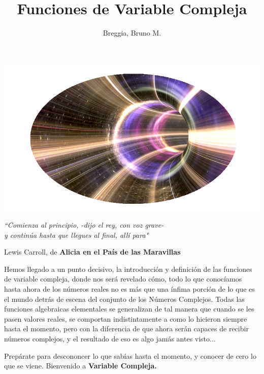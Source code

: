\documentclass[12pt]{article}
\theoremstyle{definition}
\theoremstyle{theorem}
\begin{document}
	\title{Funciones de Variable Compleja}
	\author{Breggia, Bruno M.}
	\date{}
	\maketitle
	

\begin{center}
	\includegraphics[scale=0.7]{wormwhole2.png}
\end{center}	
	
\begin{center}
\textit{``Comienza al principio, -dijo el rey, con voz grave-\\ y contin\'ua hasta que llegues al final, all\'i para"}
\end{center}

\begin{flushright}
Lewis Carroll, de \textbf{Alicia en el Pa\'is de las Maravillas}
\end{flushright}

Hemos llegado a un punto decisivo, la introducci\'on y definici\'on de las funciones de variable compleja, donde nos ser\'a revelado c\'omo, todo lo que conoc\'iamos hasta ahora de los n\'umeros reales no es m\'as que una \'infima porci\'on de lo que es el mundo detr\'as de escena del conjunto de los N\'umeros Complejos. Todas las funciones algebraicas elementales se generalizan de tal manera que cuando se les pasen valores reales, se comportan indistintamente a como lo hicieron siempre hasta el momento, pero con la diferencia de que ahora ser\'an capaces de recibir n\'umeros complejos, y el resultado de eso es algo jam\'as antes visto...

Prep\'arate para descononcer lo que sab\'ias hasta el momento, y conocer de cero lo que se viene. Bienvenido a \textbf{Variable Compleja.}
\end{document}
